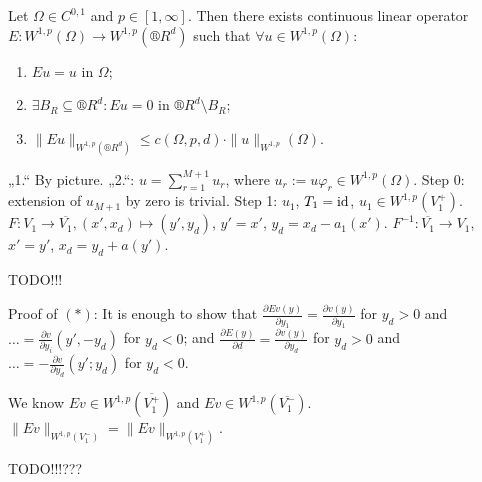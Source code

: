\documentclass[12pt]{article}					%
\begin{document}
\begin{veta}[Extension]
	Let $Ω \in C^{0, 1}$ and $p \in [1, ∞]$. Then there exists continuous linear operator $E: W^{1, p}(Ω) \rightarrow W^{1, p}(®R^d)$ such that $\forall u \in W^{1, p}(Ω)$:
	\begin{enumerate}
		\item $Eu = u$ in $Ω$;
		\item $\exists B_R \subseteq ®R^d: Eu = 0$ in $®R^d \setminus B_R$;
		\item $\|E u\|_{W^{1, p}(®R^d)} ≤ c(Ω, p, d)·\|u\|_{W^{1, p}}(Ω)$.
	\end{enumerate}

	\begin{dukazin}
		„1.“ By picture. „2.“: $u = \sum_{r=1}^{M+1} u_r$, where $u_r := u φ_r \in W^{1, p}(Ω)$. Step 0: extension of $u_{M+1}$ by zero is trivial. Step 1: $u_1$, $T_1 = \operatorname{id}$, $u_1 \in W^{1, p}(V_1^+)$. $F: V_1 \rightarrow \overline{V_1}, (x', x_d) \mapsto (y', y_d)$, $y' = x'$, $y_d = x_d - a_1(x')$. $F^{-1}: \overline{V_1} \rightarrow V_1$, $x' = y'$, $x_d = y_d + a(y')$.

		TODO!!!

		Proof of $(*)$: It is enough to show that $\frac{\partial E v(y)}{\partial y_1} = \frac{\partial v(y)}{\partial y_1}$ for $y_d > 0$ and $… = \frac{\partial v}{\partial y_i}(y', -y_d)$ for $y_d < 0$; and $\frac{\partial E(y)}{\partial d} = \frac{\partial v(y)}{\partial y_d}$ for $y_d > 0$ and $… = -\frac{\partial v}{\partial y_d}(y'; y_d)$ for $y_d < 0$.

		We know $E v \in W^{1, p}(\overline{V_1^+})$ and $E v \in W^{1, p}(\overline{V_1^-})$. $\|E v\|_{W^{1, p}(V_1^-)} = \|E v\|_{W^{1, p}(V_1^+)}$.

		TODO!!!???
	\end{dukazin}
\end{veta}

\end{document}
